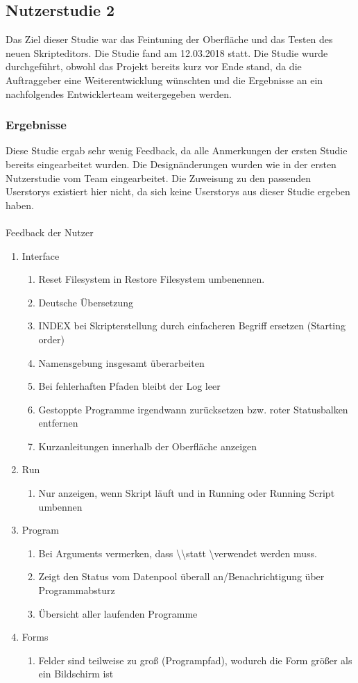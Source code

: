 \subsection{Nutzerstudie 2}
Das Ziel dieser Studie war das Feintuning der Oberfläche und das Testen des neuen
Skripteditors. Die Studie fand am 12.03.2018 statt. Die Studie wurde durchgeführt,
obwohl das Projekt bereits kurz vor Ende stand, da die Auftraggeber eine
Weiterentwicklung wünschten und die Ergebnisse an ein nachfolgendes Entwicklerteam
weitergegeben werden.


\subsubsection{Ergebnisse}
Diese Studie ergab sehr wenig Feedback, da alle Anmerkungen der ersten Studie bereits
eingearbeitet wurden. Die Designänderungen wurden wie in der ersten Nutzerstudie
vom Team eingearbeitet. Die Zuweisung zu den passenden Userstorys existiert hier nicht,
da sich keine Userstorys aus dieser Studie ergeben haben.
\\\\
{\large Feedback der Nutzer\\}
\begin{enumerate}
\item Interface
\begin{enumerate}
	\item Reset Filesystem in Restore Filesystem umbenennen.
	\item Deutsche Übersetzung
	\item INDEX bei Skripterstellung durch einfacheren Begriff ersetzen (Starting order)
	\item Namensgebung insgesamt überarbeiten
	\item Bei fehlerhaften Pfaden bleibt der Log leer
	\item Gestoppte Programme irgendwann zurücksetzen bzw. roter Statusbalken entfernen
	\item Kurzanleitungen innerhalb der Oberfläche anzeigen
\end{enumerate}
\item Run
\begin{enumerate}
	\item Nur anzeigen, wenn Skript läuft und in Running oder Running Script umbennen
\end{enumerate}
\item Program
\begin{enumerate}
	\item Bei Arguments vermerken, dass \textbackslash\textbackslash statt \textbackslash verwendet werden muss.
	\item Zeigt den Status vom Datenpool überall an/Benachrichtigung über Programmabsturz
	\item Übersicht aller laufenden Programme
\end{enumerate}
\item Forms
\begin{enumerate}
		\item Felder sind teilweise zu groß (Programpfad), wodurch die Form größer als ein Bildschirm ist
\end{enumerate}
\end{enumerate}

